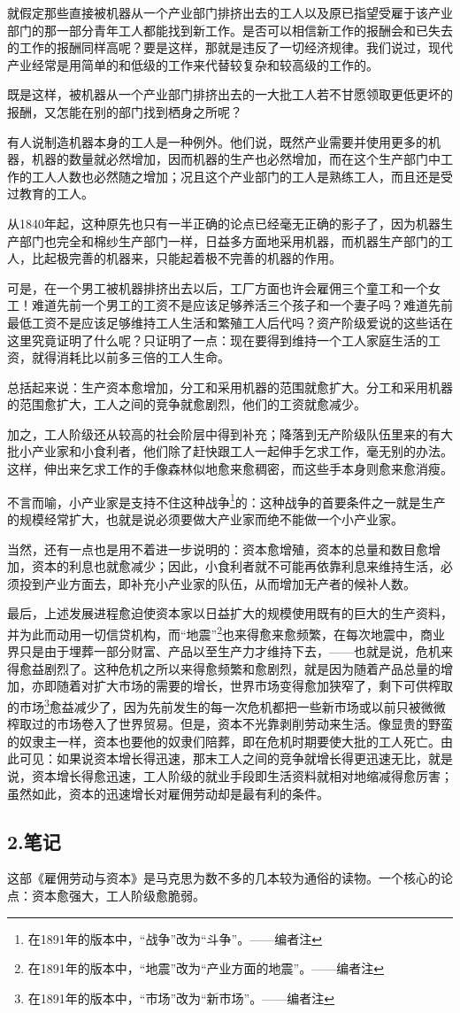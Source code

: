 \documentclass[a4paper,twoside,12pt]{ctexart}
\begin{document}
就假定那些直接被机器从一个产业部门排挤出去的工人以及原已指望受雇于该产业部门的那一部分青年工人都能找到新工作。是否可以相信新工作的报酬会和已失去的工作的报酬同样高呢？要是这样，那就是违反了一切经济规律。我们说过，现代产业经常是用简单的和低级的工作来代替较复杂和较高级的工作的。

既是这样，被机器从一个产业部门排挤出去的一大批工人若不甘愿领取更低更坏的报酬，又怎能在别的部门找到栖身之所呢？

有人说制造机器本身的工人是一种例外。他们说，既然产业需要并使用更多的机器，机器的数量就必然增加，因而机器的生产也必然增加，而在这个生产部门中工作的工人人数也必然随之增加；况且这个产业部门的工人是熟练工人，而且还是受过教育的工人。

从1840年起，这种原先也只有一半正确的论点已经毫无正确的影子了，因为机器生产部门也完全和棉纱生产部门一样，日益多方面地采用机器，而机器生产部门的工人，比起极完善的机器来，只能起着极不完善的机器的作用。

可是，在一个男工被机器排挤出去以后，工厂方面也许会雇佣三个童工和一个女工！难道先前一个男工的工资不是应该足够养活三个孩子和一个妻子吗？难道先前最低工资不是应该足够维持工人生活和繁殖工人后代吗？资产阶级爱说的这些话在这里究竟证明了什么呢？只证明了一点：现在要得到维持一个工人家庭生活的工资，就得消耗比以前多三倍的工人生命。

总括起来说：生产资本愈增加，分工和采用机器的范围就愈扩大。分工和采用机器的范围愈扩大，工人之间的竞争就愈剧烈，他们的工资就愈减少。

加之，工人阶级还从较高的社会阶层中得到补充；降落到无产阶级队伍里来的有大批小产业家和小食利者，他们除了赶快跟工人一起伸手乞求工作，毫无别的办法。这样，伸出来乞求工作的手像森林似地愈来愈稠密，而这些手本身则愈来愈消瘦。

不言而喻，小产业家是支持不住这种战争\footnote{在1891年的版本中，“战争”改为“斗争”。——编者注}的：这种战争的首要条件之一就是生产的规模经常扩大，也就是说必须要做大产业家而绝不能做一个小产业家。

当然，还有一点也是用不着进一步说明的：资本愈增殖，资本的总量和数目愈增加，资本的利息也就愈减少；因此，小食利者就不可能再依靠利息来维持生活，必须投到产业方面去，即补充小产业家的队伍，从而增加无产者的候补人数。

最后，上述发展进程愈迫使资本家以日益扩大的规模使用既有的巨大的生产资料，并为此而动用一切信贷机构，而“地震”\footnote{在1891年的版本中，“地震”改为“产业方面的地震”。——编者注}也来得愈来愈频繁，在每次地震中，商业界只是由于埋葬一部分财富、产品以至生产力才维持下去，——也就是说，危机来得愈益剧烈了。这种危机之所以来得愈频繁和愈剧烈，就是因为随着产品总量的增加，亦即随着对扩大市场的需要的增长，世界市场变得愈加狭窄了，剩下可供榨取的市场\footnote{在1891年的版本中，“市场”改为“新市场”。——编者注}愈益减少了，因为先前发生的每一次危机都把一些新市场或以前只被微微榨取过的市场卷入了世界贸易。但是，资本不光靠剥削劳动来生活。像显贵的野蛮的奴隶主一样，资本也要他的奴隶们陪葬，即在危机时期要使大批的工人死亡。由此可见：如果说资本增长得迅速，那末工人之间的竞争就增长得更迅速无比，就是说，资本增长得愈迅速，工人阶级的就业手段即生活资料就相对地缩减得愈厉害；虽然如此，资本的迅速增长对雇佣劳动却是最有利的条件。

\newpage

\subsection{2.笔记}

这部《雇佣劳动与资本》是马克思为数不多的几本较为通俗的读物。一个核心的论点：资本愈强大，工人阶级愈脆弱。
\end{document}
